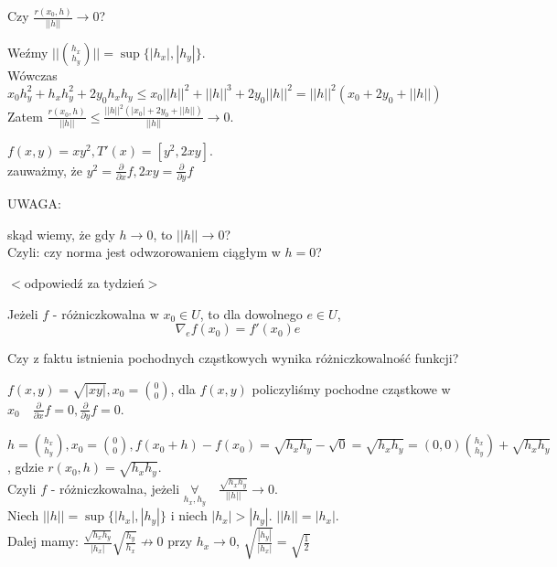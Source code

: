 \documentclass[../main.tex]{subfiles}
\begin{document}
\vspace{0.3cm}
Czy $\frac{r(x_0,h)}{||h||}\to 0$?

\vspace{0.3cm}
Weźmy $||\binom{h_x}{h_y}|| = \sup\{|h_x|,|h_y|\}$.\\
Wówczas $x_0h_y^2 + h_xh_y^2 + 2y_0h_xh_y \leq x_0 ||h||^2 + ||h||^3 + 2y_0||h||^2 = ||h||^2(x_0 +2y_0 + ||h||)$\\
Zatem $\frac{r(x_0,h)}{||h||} \leq \frac{||h||^2(|x_0|+2y_0+||h||)}{||h||} \to 0$.

$f(x,y)=xy^2, T'(x)=[y^2,2xy]$.\\
\vspace{0.3cm}
zauważmy, że $y^2= \frac{\partial}{\partial x} f, 2xy = \frac{\partial}{\partial y} f$\\
\begin{large}
    UWAGA:
\end{large}skąd wiemy, że gdy $h\to 0$, to $||h||\to 0$?\\
Czyli: czy norma jest odwzorowaniem ciągłym w $h=0$?

$<$odpowiedź za tydzień$>$

\begin{tw}
Jeżeli $f$ - różniczkowalna w $x_0 \in U$, to dla dowolnego $e\in U$, $$\nabla_e f(x_0) = f'(x_0)e$$
\end{tw}

\begin{dowod}
\end{dowod}


\begin{pytanie}
Czy z faktu istnienia pochodnych cząstkowych wynika różniczkowalność funkcji?
\end{pytanie}

\begin{przyklad}
\end{przyklad}
$f(x,y) = \sqrt{|xy|}, x_0=\binom{0}{0}$, dla $f(x,y)$ policzyliśmy pochodne cząstkowe w $x_0 \quad \frac{\partial}{\partial x} f = 0, \frac{\partial}{\partial y} f = 0$.
\vspace{0.3cm}

$h=\binom{h_x}{h_y}, x_0=\binom{0}{0}, f(x_0+h)-f(x_0) = \sqrt{h_xh_y} - \sqrt{0} = \sqrt{h_xh_y} = (0,0)\binom{h_x}{h_y} + \sqrt{h_xh_y}$, gdzie $r(x_0,h) = \sqrt{h_xh_y}$.\\
Czyli $f$ - różniczkowalna, jeżeli $\underset{h_x,h_y}{\forall}\quad \frac{\sqrt{h_xh_y}}{||h||}\to0$.\\
\vspace{0.3cm}
Niech $||h|| = \sup\{|h_x|,|h_y|\}$ i niech $|h_x|>|h_y|$. $||h|| = |h_x|.$\\
Dalej mamy: $\frac{\sqrt{h_xh_y}}{|h_x|}\sqrt{\frac{h_y}{h_x}} \not\to 0 \text{ przy }h_x\to0$, $\sqrt{\frac{|h_y|}{|h_x|}}=\sqrt{\frac{1}{2}}$
\vspace{0.3cm}
\end{document}
